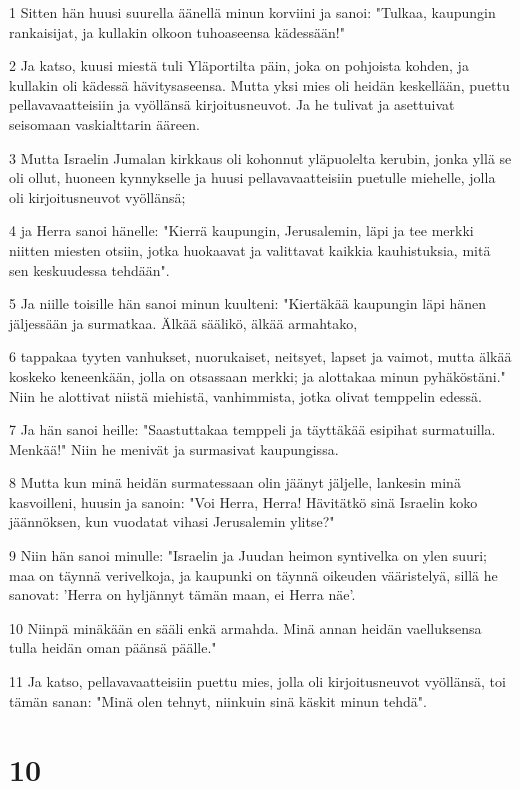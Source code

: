 \par 1 Sitten hän huusi suurella äänellä minun korviini ja sanoi: "Tulkaa, kaupungin rankaisijat, ja kullakin olkoon tuhoaseensa kädessään!"
\par 2 Ja katso, kuusi miestä tuli Yläportilta päin, joka on pohjoista kohden, ja kullakin oli kädessä hävitysaseensa. Mutta yksi mies oli heidän keskellään, puettu pellavavaatteisiin ja vyöllänsä kirjoitusneuvot. Ja he tulivat ja asettuivat seisomaan vaskialttarin ääreen.
\par 3 Mutta Israelin Jumalan kirkkaus oli kohonnut yläpuolelta kerubin, jonka yllä se oli ollut, huoneen kynnykselle ja huusi pellavavaatteisiin puetulle miehelle, jolla oli kirjoitusneuvot vyöllänsä;
\par 4 ja Herra sanoi hänelle: "Kierrä kaupungin, Jerusalemin, läpi ja tee merkki niitten miesten otsiin, jotka huokaavat ja valittavat kaikkia kauhistuksia, mitä sen keskuudessa tehdään".
\par 5 Ja niille toisille hän sanoi minun kuulteni: "Kiertäkää kaupungin läpi hänen jäljessään ja surmatkaa. Älkää säälikö, älkää armahtako,
\par 6 tappakaa tyyten vanhukset, nuorukaiset, neitsyet, lapset ja vaimot, mutta älkää koskeko keneenkään, jolla on otsassaan merkki; ja alottakaa minun pyhäköstäni." Niin he alottivat niistä miehistä, vanhimmista, jotka olivat temppelin edessä.
\par 7 Ja hän sanoi heille: "Saastuttakaa temppeli ja täyttäkää esipihat surmatuilla. Menkää!" Niin he menivät ja surmasivat kaupungissa.
\par 8 Mutta kun minä heidän surmatessaan olin jäänyt jäljelle, lankesin minä kasvoilleni, huusin ja sanoin: "Voi Herra, Herra! Hävitätkö sinä Israelin koko jäännöksen, kun vuodatat vihasi Jerusalemin ylitse?"
\par 9 Niin hän sanoi minulle: "Israelin ja Juudan heimon syntivelka on ylen suuri; maa on täynnä verivelkoja, ja kaupunki on täynnä oikeuden vääristelyä, sillä he sanovat: 'Herra on hyljännyt tämän maan, ei Herra näe'.
\par 10 Niinpä minäkään en sääli enkä armahda. Minä annan heidän vaelluksensa tulla heidän oman päänsä päälle."
\par 11 Ja katso, pellavavaatteisiin puettu mies, jolla oli kirjoitusneuvot vyöllänsä, toi tämän sanan: "Minä olen tehnyt, niinkuin sinä käskit minun tehdä".

\chapter{10}


